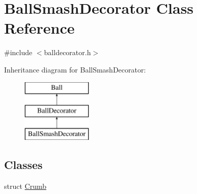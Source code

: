 \hypertarget{class_ball_smash_decorator}{}\section{Ball\+Smash\+Decorator Class Reference}
\label{class_ball_smash_decorator}


{\ttfamily \#include $<$balldecorator.\+h$>$}

Inheritance diagram for Ball\+Smash\+Decorator\+:\begin{figure}[H]
\begin{center}
\leavevmode
\includegraphics[height=3.000000cm]{class_ball_smash_decorator}
\end{center}
\end{figure}
\subsection*{Classes}
\begin{DoxyCompactItemize}
\item 
struct \mbox{\hyperlink{struct_ball_smash_decorator_1_1_crumb}{Crumb}}
\end{DoxyCompactItemize}
